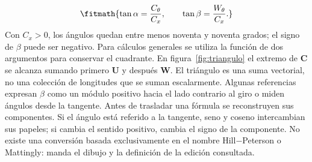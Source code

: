 \documentclass[10pt,openany]{book}
\begin{document}
\[
\fitmath{\tan\alpha=\frac{C_\theta}{C_x},\qquad \tan\beta=\frac{W_\theta}{C_x}.}
\]
Con \(C_x>0\), los ángulos quedan entre menos noventa y noventa grados; el signo de \(\beta\) puede ser negativo. Para cálculos generales se utiliza la función de dos argumentos para conservar el cuadrante. En figura~\ref{fig:triangulo} el extremo de \(\mathbf C\) se alcanza sumando primero \(\mathbf U\) y después \(\mathbf W\). El triángulo es una suma vectorial, no una colección de longitudes que se suman escalarmente.
Algunas referencias expresan \(\beta\) como un módulo positivo hacia el lado contrario al giro o miden ángulos desde la tangente. Antes de trasladar una fórmula se reconstruyen sus componentes. Si el ángulo está referido a la tangente, seno y coseno intercambian sus papeles; si cambia el sentido positivo, cambia el signo de la componente. No existe una conversión basada exclusivamente en el nombre Hill\(-\)Peterson o Mattingly: manda el dibujo y la definición de la edición consultada.
\end{document}
